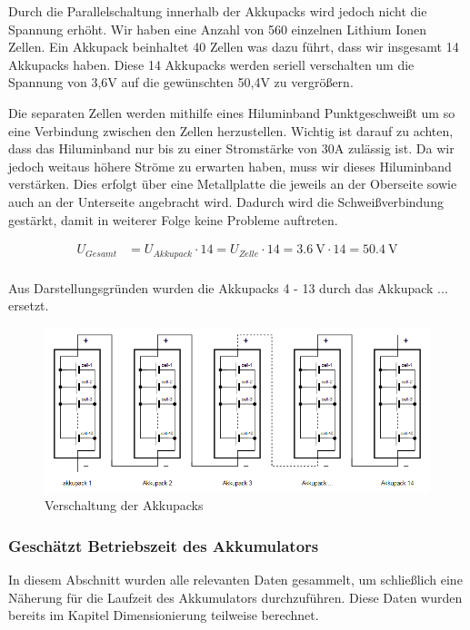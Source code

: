 Durch die Parallelschaltung innerhalb der Akkupacks wird jedoch nicht die Spannung erhöht. Wir haben eine Anzahl von 560 einzelnen Lithium Ionen Zellen. Ein Akkupack beinhaltet 40 Zellen was dazu führt, dass wir insgesamt 14 Akkupacks haben. Diese 14 Akkupacks werden seriell verschalten um die Spannung von 3,6V auf die gewünschten 50,4V zu vergrößern.

Die separaten Zellen werden mithilfe eines Hiluminband Punktgeschweißt um so eine Verbindung zwischen den Zellen herzustellen.
Wichtig ist darauf zu achten, dass das Hiluminband nur bis zu einer Stromstärke von 30A zulässig ist. Da wir jedoch weitaus höhere Ströme zu erwarten haben, muss wir dieses Hiluminband verstärken. Dies erfolgt über eine Metallplatte die jeweils an der Oberseite sowie auch an der Unterseite angebracht wird. Dadurch wird die Schweißverbindung gestärkt, damit in weiterer Folge keine Probleme auftreten. 

\begin{align*}
U_{Gesamt} &= U_{Akkupack} \cdot 14= U_{Zelle} \cdot 14= 3.6~\mathrm{V} \cdot 14 = 50.4~\mathrm{V}\\
\end{align*}

Aus Darstellungsgründen wurden die Akkupacks 4 - 13 durch das  Akkupack ... ersetzt.

\begin{figure}[H]
	\begin{center}
		\includegraphics[scale=0.9]{figures/Akku/VerschaltungderAkkupacks.PNG}
		\caption{Verschaltung der Akkupacks}
		\label{Verschaltung der Akkupacks}
	\end{center}
\end{figure}
\newpage
\subsubsection{Geschätzt Betriebszeit des Akkumulators}

In diesem Abschnitt wurden alle relevanten Daten gesammelt, um schließlich eine Näherung für die Laufzeit des Akkumulators durchzuführen. Diese Daten wurden bereits im Kapitel Dimensionierung teilweise berechnet.

